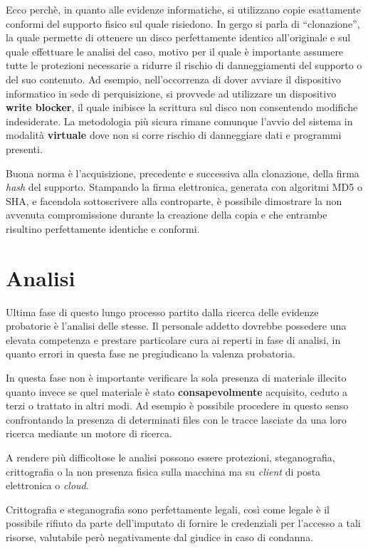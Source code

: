 Ecco perchè, in quanto alle evidenze informatiche, si utilizzano copie esattamente conformi del supporto fisico sul quale risiedono. In gergo si parla di ``clonazione'', la quale permette di ottenere un disco perfettamente identico all'originale e sul quale effettuare le analisi del caso, motivo per il quale è importante assumere tutte le protezioni necessarie a ridurre il rischio di danneggiamenti del supporto o del suo contenuto. Ad esempio, nell'occorrenza di dover avviare il dispositivo informatico in sede di perquisizione, si provvede ad utilizzare un dispositivo \textbf{write blocker}, il quale inibisce la scrittura sul disco non consentendo modifiche indesiderate. La metodologia più sicura rimane comunque l'avvio del sistema in modalità \textbf{virtuale} dove non si corre rischio di danneggiare dati e programmi presenti.

Buona norma è l'acquisizione, precedente e successiva alla clonazione, della firma \textit{hash} del supporto. Stampando la firma elettronica, generata con algoritmi MD5 o SHA, e facendola sottoscrivere alla controparte, è possibile dimostrare la non avvenuta compromissione durante la creazione della copia e che entrambe risultino perfettamente identiche e conformi.

\section{Analisi}

Ultima fase di questo lungo processo partito dalla ricerca delle evidenze probatorie è l'analisi delle stesse.
Il personale addetto dovrebbe possedere una elevata competenza e prestare particolare cura ai reperti in fase di analisi, in quanto errori in questa fase ne pregiudicano la valenza probatoria.

In questa fase non è importante verificare la sola presenza di materiale illecito quanto invece se quel materiale è stato \textbf{consapevolmente} acquisito, ceduto a terzi o trattato in altri modi. Ad esempio è possibile procedere in questo senso confrontando la presenza di determinati files con le tracce lasciate da una loro ricerca mediante un motore di ricerca.

A rendere più difficoltose le analisi possono essere protezioni, steganografia, crittografia o la non presenza fisica sulla macchina ma su \textit{client} di posta elettronica o \textit{cloud}.

Crittografia e steganografia sono perfettamente legali, così come legale è il possibile rifiuto da parte dell'imputato di fornire le credenziali per l'accesso a tali risorse, valutabile però negativamente dal giudice in caso di condanna.

